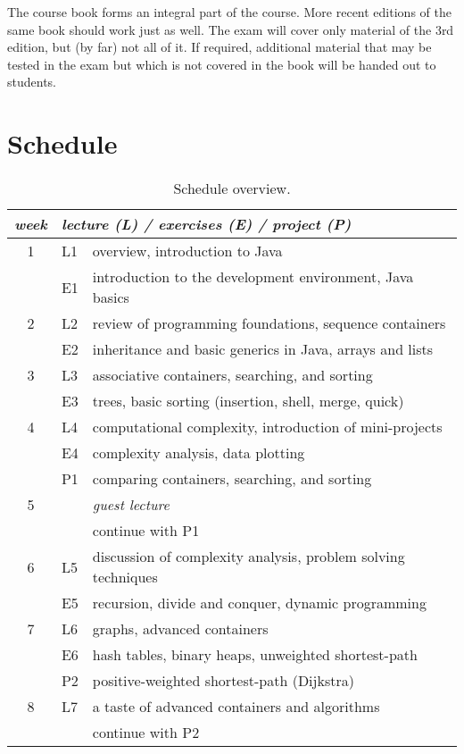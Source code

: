 \documentclass[a4paper,twoculumn,10pt]{article}
\begin{document}
The course book forms an integral part of the course.
More recent editions of the same book should work just as well.
The exam will cover only material of the 3rd edition, but (by far) not all of it.
If required, additional material that may be tested in the exam but which is not covered in the book will be handed out to students.



\section{Schedule}

\begin{table}
  \centering
  \begin{tabular}{c|ll}
    \emph{week} & \multicolumn{2}{l}{\emph{lecture (L) / exercises (E) / project (P)}} \\
    \hline
    1 &
    L1 &
    overview, introduction to Java
    \\
    & E1 &
    introduction to the development environment, Java basics
    \\
    2 &
    L2 &
    review of programming foundations, sequence containers
    \\
    & E2 &
    inheritance and basic generics in Java, arrays and lists
    \\
    3 &
    L3 &
    associative containers, searching, and sorting
    \\
    & E3 &
    trees, basic sorting (insertion, shell, merge, quick)
    \\
    4 &
    L4 &
    computational complexity, introduction of mini-projects
    \\
    & E4 &
    complexity analysis, data plotting
    \\
    & P1 &
    comparing containers, searching, and sorting
    \\
    5 & &
    \emph{guest lecture}
    \\
    & &
    continue with P1
    \\
    6 &
    L5 &
    discussion of complexity analysis, problem solving techniques
    \\
    & E5 &
    recursion, divide and conquer, dynamic programming
    \\
    7 &
    L6 &
    graphs, advanced containers
    \\
    & E6 &
    hash tables, binary heaps, unweighted shortest-path
    \\
    & P2 &
    positive-weighted shortest-path (Dijkstra)
    \\
    8 &
    L7 &
    a taste of advanced containers and algorithms
    \\
    & &
    continue with P2
    \\
    \hline
  \end{tabular}
  \caption{Schedule overview.}\label{tab:schedule}
\end{table}
\end{document}
